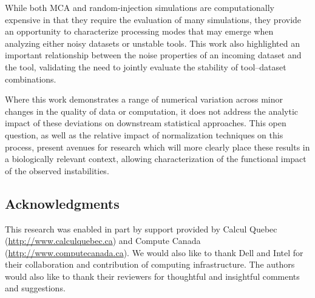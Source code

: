 \documentclass[fleqn,12pt]{SelfArx_ch} %
\begin{document}
While both MCA and random-injection simulations are computationally expensive in that they require the evaluation of
many simulations, they provide an opportunity to characterize processing modes that may emerge when analyzing either
noisy datasets or unstable tools. This work also highlighted an important relationship between the noise properties of
an incoming dataset and the tool, validating the need to jointly evaluate the stability of tool--dataset combinations.

Where this work demonstrates a range of numerical variation across minor changes in the quality of data or computation,
it does not address the analytic impact of these deviations on downstream statistical approaches. This open question,
as well as the relative impact of normalization techniques on this process, present avenues for research which will
more clearly place these results in a biologically relevant context, allowing characterization of the functional impact
of the observed instabilities.

\subsection*{Acknowledgments}
This research was enabled in part by support provided by Calcul Quebec
(\href{http://www.calculquebec.ca}{http://www.calculquebec.ca}) and Compute Canada (\href{http://www.computecanada.ca}{http://www.computecanada.ca}). We would also
like to thank Dell and Intel for their collaboration and contribution of computing infrastructure. The authors would
also like to thank their reviewers for thoughtful and insightful comments and suggestions.

{\small 


}
\end{document}
